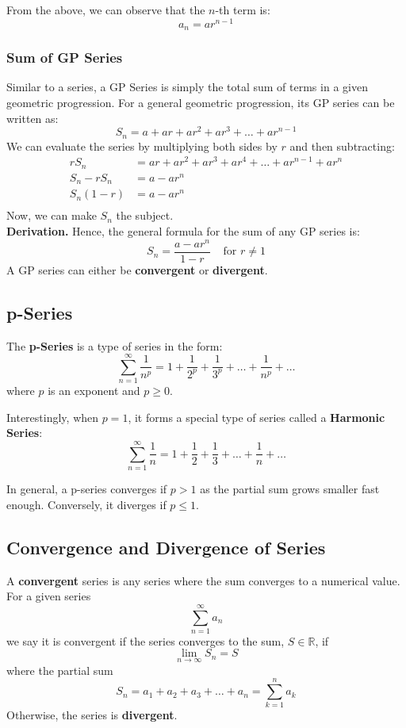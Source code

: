\documentclass[12pt]{article}
\begin{document}
From the above, we can observe that the $n$-th term is:
\[
	a_n = ar^{n-1}
\]

\subsubsection{Sum of GP Series}

Similar to a series, a GP Series is simply the total sum of terms in a given geometric progression. For a general geometric progression, its GP series can be written as:
\[
	S_n = a + ar + ar^2 + ar^3 + \dots + ar^{n-1}
\]
We can evaluate the series by multiplying both sides by $r$ and then subtracting:
\begin{align*}
	rS_n       & = ar + ar^2 + ar^3 + ar^4 + \dots + ar^{n-1} + ar^n \\
	S_n - rS_n & = a - ar^n                                          \\
	S_n(1 - r) & = a - ar^n                                          \\
\end{align*}
Now, we can make $S_n$ the subject.\\
\textbf{Derivation.} Hence, the general formula for the sum of any GP series is:
\[
	S_n = \frac{a - ar^n}{1 - r}   \;\;\;\;   \text{for } r \neq 1
\]
A GP series can either be \textbf{convergent} or \textbf{divergent}.

\subsection{p-Series}

The \textbf{p-Series} is a type of series in the form:
\[
	\displaystyle\sum_{n=1}^{\infty}\frac{1}{n^p} = 1 + \frac{1}{2^p} + \frac{1}{3^p} + \dots + \frac{1}{n^p} + \dots
\]
where $p$ is an exponent and $p \geq 0$.

Interestingly, when $p = 1$, it forms a special type of series called a \textbf{Harmonic Series}:
\[
	\displaystyle\sum_{n=1}^{\infty}\frac{1}{n} = 1 + \frac{1}{2} + \frac{1}{3} + \dots + \frac{1}{n} + \dots
\]

In general, a p-series converges if $p > 1$ as the partial sum grows smaller fast enough. Conversely, it diverges if $p \leq 1$.

\subsection{Convergence and Divergence of Series}
A \textbf{convergent} series is any series where the sum converges to a numerical value. For a given series
\[
	\displaystyle\sum_{n=1}^{\infty}a_n
\]
we say it is convergent if the series converges to the sum, $S \in \mathbb{R}$, if
\[
	\displaystyle\lim_{n\rightarrow\infty}S_n = S
\]
where the partial sum
\[
	S_n = a_1 + a_2 + a_3 + \dots + a_n = \displaystyle\sum_{k=1}^{n}a_k
\]
Otherwise, the series is \textbf{divergent}.
\end{document}
